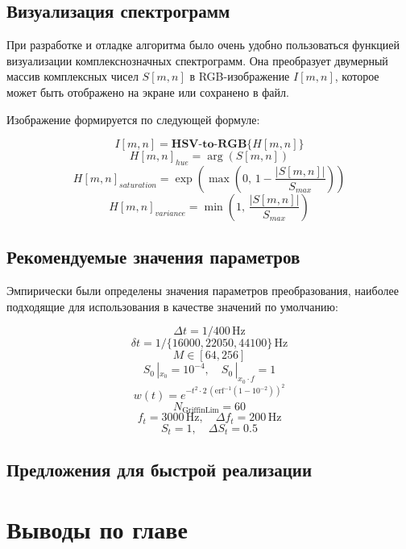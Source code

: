 \subsection{Визуализация спектрограмм}
При разработке и отладке алгоритма было очень удобно пользоваться функцией визуализации комплекснозначных спектрограмм.
Она преобразует двумерный массив комплексных чисел $S[m,n]$ в RGB-изображение $I[m,n]$, которое может быть отображено на экране или сохранено в файл.

Изображение формируется по следующей формуле:

\begin{equation}
  I[m,n] = \textbf{HSV-to-RGB}\{H[m,n]\}
\end{equation}
\[ H[m,n]_{hue} = \arg(S[m,n]) \]
\[ H[m,n]_{saturation} = \exp(\max(0,\, 1 - \frac{|S[m,n]|}{S_{max}})) \]
\[ H[m,n]_{variance} = \min(1,\, \frac{|S[m,n]|}{S_{max}}) \]


\subsection{Рекомендуемые значения параметров}

Эмпирически были определены значения параметров преобразования, наиболее подходящие для использования в качестве значений по умолчанию:

\begin{equation}
  \Delta t = 1 / 400 \, \mathrm{Hz}
\end{equation}
\[ \delta t = 1 / \{16000, 22050, 44100\} \, \mathrm{Hz} \]
\[ M \in [64, 256] \]
\[ S_0\,|_{x_0} = 10^{-4}, \quad S_0\,|_{x_0 \cdot f} = 1 \]
\[ w(t) = e^{-t^2 \cdot 2 \, (\mathrm{erf}^{-1}(1 - 10^{-2}))^2 } \]
\[ N_{\mathrm{GriffinLim}} = 60 \]
\[ f_t = 3000 \, \mathrm{Hz}, \quad \Delta f_t = 200 \, \mathrm{Hz} \]
\[ S_t = 1, \quad \Delta S_t = 0.5 \]




\subsection{Предложения для быстрой реализации}


\section{Выводы по главе}
